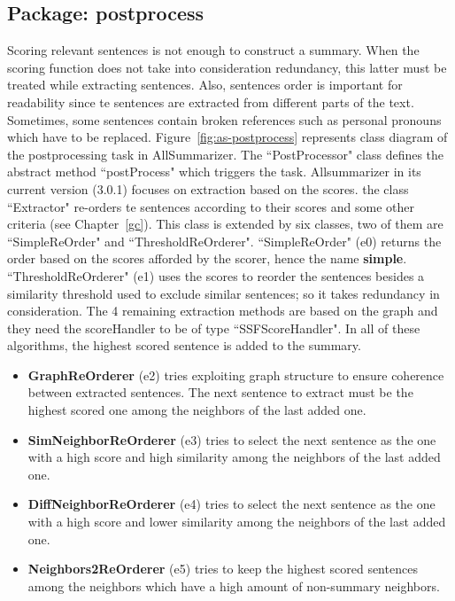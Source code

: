 \subsection{Package: postprocess}

Scoring relevant sentences is not enough to construct a summary. 
When the scoring function does not take into consideration redundancy, this latter must be treated while extracting sentences. 
Also, sentences order is important for readability since te sentences are extracted from different parts of the text. 
Sometimes, some sentences contain broken references such as personal pronouns which have to be replaced. 
Figure~\ref{fig:as-postprocess} represents class diagram of the postprocessing task in AllSummarizer. 
The ``PostProcessor" class defines the abstract method ``postProcess" which triggers the task. 
Allsummarizer in its current version (3.0.1) focuses on extraction based on the scores.
the class ``Extractor" re-orders te sentences according to their scores and some other criteria (see Chapter~\ref{gc}). 
This class is extended by six classes, two of them are ``SimpleReOrder" and ``ThresholdReOrderer".
``SimpleReOrder" (e0) returns the order based on the scores afforded by the scorer, hence the name \textbf{simple}. 
``ThresholdReOrderer" (e1) uses the scores to reorder the sentences besides a similarity threshold used to exclude similar sentences; so it takes redundancy in consideration.
The 4 remaining extraction methods are based on the graph and they need the scoreHandler to be of type ``SSFScoreHandler".  
In all of these algorithms, the highest scored sentence is added to the summary.
\begin{itemize}
	\item \textbf{GraphReOrderer} (e2) tries exploiting graph structure to ensure coherence between extracted sentences.
	The next sentence to extract must be the highest scored one among the neighbors of the last added one.
	
	\item \textbf{SimNeighborReOrderer} (e3) tries to select the next sentence as the one with a high score and high similarity among the neighbors of the last added one. 
	
	\item \textbf{DiffNeighborReOrderer} (e4) tries to select the next sentence as the one with a high score and lower similarity among the neighbors of the last added one. 
	
	\item \textbf{Neighbors2ReOrderer} (e5) tries to keep the highest scored sentences among the neighbors which have a high amount of non-summary neighbors. 
\end{itemize}

